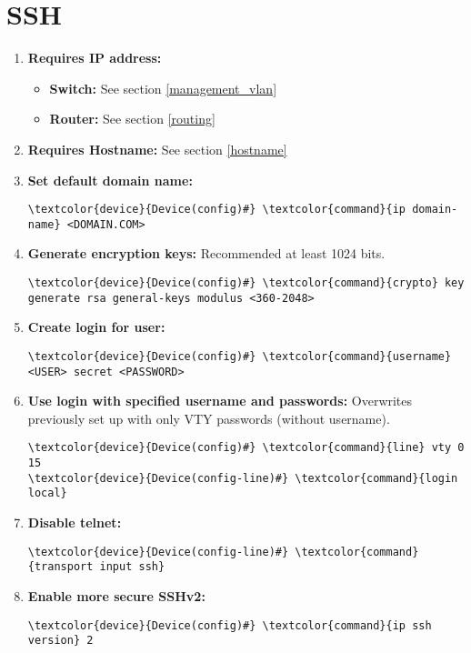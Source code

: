 \documentclass[10pt, a4paper, onecolumn, oneside, titlepage, openany]{book}
\begin{document}
\section{SSH}
\begin{enumerate}
    \item \textbf{Requires IP address:}
    \begin{itemize}
        \item \textbf{Switch:}
        \newline See section \ref{management_vlan}
        \item \textbf{Router:}
        \newline See section \ref{routing}
    \end{itemize}
    \item \textbf{Requires Hostname:}
    \newline See section \ref{hostname}
    \item \textbf{Set default domain name:}
\begin{Verbatim}[commandchars=\\\{\}]
\textcolor{device}{Device(config)#} \textcolor{command}{ip domain-name} <DOMAIN.COM>
\end{Verbatim}
    \item \textbf{Generate encryption keys:}
    Recommended at least 1024 bits.
\begin{Verbatim}[commandchars=\\\{\}]
\textcolor{device}{Device(config)#} \textcolor{command}{crypto} key generate rsa general-keys modulus <360-2048>
\end{Verbatim}
    \item \textbf{Create login for user:}
\begin{Verbatim}[commandchars=\\\{\}]
\textcolor{device}{Device(config)#} \textcolor{command}{username} <USER> secret <PASSWORD>
\end{Verbatim}
    \item \textbf{Use login with specified username and passwords:}
    \newline Overwrites previously set up with only VTY passwords (without username).
\begin{Verbatim}[commandchars=\\\{\}]
\textcolor{device}{Device(config)#} \textcolor{command}{line} vty 0 15
\textcolor{device}{Device(config-line)#} \textcolor{command}{login local}
\end{Verbatim}
    \item \textbf{Disable telnet:}
\begin{Verbatim}[commandchars=\\\{\}]
\textcolor{device}{Device(config-line)#} \textcolor{command}{transport input ssh}
\end{Verbatim}
    \item \textbf{Enable more secure SSHv2:}
\begin{Verbatim}[commandchars=\\\{\}]
\textcolor{device}{Device(config)#} \textcolor{command}{ip ssh version} 2
\end{Verbatim}
\end{enumerate}
\end{document}
